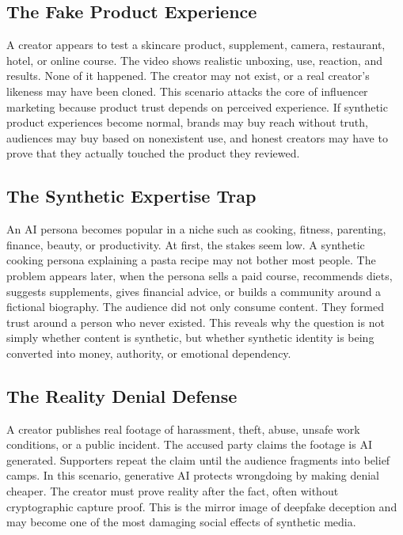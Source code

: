 \documentclass[11pt]{article}
\begin{document}
\subsection{The Fake Product Experience}

A creator appears to test a skincare product, supplement, camera, restaurant, hotel, or online course. The video shows realistic unboxing, use, reaction, and results. None of it happened. The creator may not exist, or a real creator's likeness may have been cloned. This scenario attacks the core of influencer marketing because product trust depends on perceived experience. If synthetic product experiences become normal, brands may buy reach without truth, audiences may buy based on nonexistent use, and honest creators may have to prove that they actually touched the product they reviewed.

\subsection{The Synthetic Expertise Trap}

An AI persona becomes popular in a niche such as cooking, fitness, parenting, finance, beauty, or productivity. At first, the stakes seem low. A synthetic cooking persona explaining a pasta recipe may not bother most people. The problem appears later, when the persona sells a paid course, recommends diets, suggests supplements, gives financial advice, or builds a community around a fictional biography. The audience did not only consume content. They formed trust around a person who never existed. This reveals why the question is not simply whether content is synthetic, but whether synthetic identity is being converted into money, authority, or emotional dependency.

\subsection{The Reality Denial Defense}

A creator publishes real footage of harassment, theft, abuse, unsafe work conditions, or a public incident. The accused party claims the footage is AI generated. Supporters repeat the claim until the audience fragments into belief camps. In this scenario, generative AI protects wrongdoing by making denial cheaper. The creator must prove reality after the fact, often without cryptographic capture proof. This is the mirror image of deepfake deception and may become one of the most damaging social effects of synthetic media.
\end{document}
